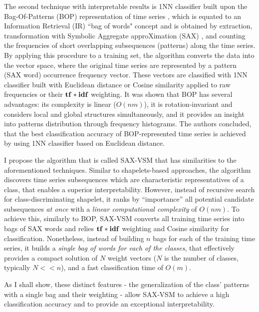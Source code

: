 The second technique with interpretable results is 1NN classifier built upon the Bag-Of-Patterns (BOP) representation of time series 
\cite{citeulike:10525778}, which is equated to an Information Retrieval (IR) ``bag of words" concept 
and is obtained by extraction, transformation with Symbolic Aggregate approXimation (SAX) \cite{sax}, and counting the frequencies
of short overlapping subsequences (patterns) along the time series.
By applying this procedure to a training set, the algorithm converts the data into the vector space, where the original time series are 
represented by a pattern (SAX word) occurrence frequency vector. These vectors are classified with 1NN classifier built with Euclidean 
distance or Cosine similarity applied to raw frequencies or their $\text{\textbf{tf}}\ast\text{\textbf{idf}}$ weighting. 
It was shown that BOP has several advantages: its complexity is linear ($O(nm)$), it is rotation-invariant and considers local and 
global structures simultaneously, and it provides an insight into patterns distribution through frequency histograms.
The authors concluded, that the best classification accuracy of BOP-represented time series is achieved by using 1NN classifier based 
on Euclidean distance. 

I propose the algorithm that is called \mbox{SAX-VSM} that has similarities to the aforementioned techniques. 
Similar to shapelets-based approaches, the algorithm discovers time series subsequences which are characteristic representatives of a 
class, that enables a superior interpretability. 
However, instead of recursive search for class-discriminating shapelet, it ranks by “importance” all potential candidate subsequences 
\textit{at once} with a \textit{linear computational complexity} of $O(nm)$.
To achieve this, similarly to BOP, \mbox{SAX-VSM} converts all training time series into bags of SAX words and relies $\text{\textbf{tf}}\ast\text{\textbf{idf}}$ 
weighting and Cosine similarity for classification. Nonetheless, instead of building $n$ bags for each of the training time series, 
it builds a \textit{single bag of words for each of the classes}, that effectively provides a compact solution of $N$ weight vectors 
($N$ is the number of classes, typically $N<<n$), and a fast classification time of $O(m)$.

As I shall show, these distinct features - the generalization of the class' patterns with a single bag and their weighting - allow 
SAX-VSM to achieve a high classification accuracy and to provide an exceptional interpretability.

